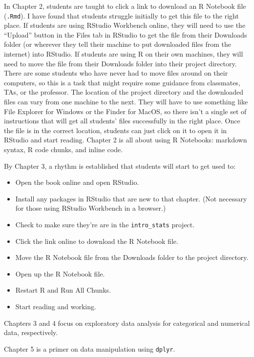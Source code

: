 \documentclass[
]{book}
\providecommand{\tightlist}{%
  \setlength{\itemsep}{0pt}\setlength{\parskip}{0pt}}
\begin{document}
In Chapter 2, students are taught to click a link to download an R Notebook file (\texttt{.Rmd}). I have found that students struggle initially to get this file to the right place. If students are using RStudio Workbench online, they will need to use the ``Upload'' button in the Files tab in RStudio to get the file from their Downloads folder (or wherever they tell their machine to put downloaded files from the internet) into RStudio. If students are using R on their own machines, they will need to move the file from their Downloads folder into their project directory. There are some students who have never had to move files around on their computers, so this is a task that might require some guidance from classmates, TAs, or the professor. The location of the project directory and the downloaded files can vary from one machine to the next. They will have to use something like File Explorer for Windows or the Finder for MacOS, so there isn't a single set of instructions that will get all students' files successfully in the right place. Once the file is in the correct location, students can just click on it to open it in RStudio and start reading. Chapter 2 is all about using R Notebooks: markdown syntax, R code chunks, and inline code.

By Chapter 3, a rhythm is established that students will start to get used to:

\begin{itemize}
\tightlist
\item
  Open the book online and open RStudio.
\item
  Install any packages in RStudio that are new to that chapter. (Not necessary for those using RStudio Workbench in a browser.)
\item
  Check to make sure they're are in the \texttt{intro\_stats} project.
\item
  Click the link online to download the R Notebook file.
\item
  Move the R Notebook file from the Downloads folder to the project directory.
\item
  Open up the R Notebook file.
\item
  Restart R and Run All Chunks.
\item
  Start reading and working.
\end{itemize}

Chapters 3 and 4 focus on exploratory data analysis for categorical and numerical data, respectively.

Chapter 5 is a primer on data manipulation using \texttt{dplyr}.
\end{document}
